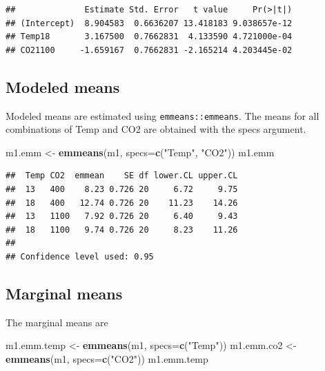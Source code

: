 \documentclass[]{book}
\newenvironment{Shaded}{\begin{snugshade}}{\end{snugshade}}
\newcommand{\DataTypeTok}[1]{\textcolor[rgb]{0.13,0.29,0.53}{#1}}
\newcommand{\KeywordTok}[1]{\textcolor[rgb]{0.13,0.29,0.53}{\textbf{#1}}}
\newcommand{\NormalTok}[1]{#1}
\newcommand{\StringTok}[1]{\textcolor[rgb]{0.31,0.60,0.02}{#1}}
\begin{document}
\begin{verbatim}
##              Estimate Std. Error   t value     Pr(>|t|)
## (Intercept)  8.904583  0.6636207 13.418183 9.038657e-12
## Temp18       3.167500  0.7662831  4.133590 4.721000e-04
## CO21100     -1.659167  0.7662831 -2.165214 4.203445e-02
\end{verbatim}

\hypertarget{modeled-means}{%
\subsection{Modeled means}\label{modeled-means}}

Modeled means are estimated using \texttt{emmeans::emmeans}. The means for all combinations of Temp and CO2 are obtained with the specs argument.

\begin{Shaded}
\begin{Highlighting}[]
\NormalTok{m1.emm <-}\StringTok{ }\KeywordTok{emmeans}\NormalTok{(m1, }\DataTypeTok{specs=}\KeywordTok{c}\NormalTok{(}\StringTok{"Temp"}\NormalTok{, }\StringTok{"CO2"}\NormalTok{))}
\NormalTok{m1.emm}
\end{Highlighting}
\end{Shaded}

\begin{verbatim}
##  Temp CO2  emmean    SE df lower.CL upper.CL
##  13   400    8.23 0.726 20     6.72     9.75
##  18   400   12.74 0.726 20    11.23    14.26
##  13   1100   7.92 0.726 20     6.40     9.43
##  18   1100   9.74 0.726 20     8.23    11.26
## 
## Confidence level used: 0.95
\end{verbatim}

\hypertarget{marginal-means}{%
\subsection{Marginal means}\label{marginal-means}}

The marginal means are

\begin{Shaded}
\begin{Highlighting}[]
\NormalTok{m1.emm.temp <-}\StringTok{ }\KeywordTok{emmeans}\NormalTok{(m1, }\DataTypeTok{specs=}\KeywordTok{c}\NormalTok{(}\StringTok{"Temp"}\NormalTok{))}
\NormalTok{m1.emm.co2 <-}\StringTok{ }\KeywordTok{emmeans}\NormalTok{(m1, }\DataTypeTok{specs=}\KeywordTok{c}\NormalTok{(}\StringTok{"CO2"}\NormalTok{))}
\NormalTok{m1.emm.temp}
\end{Highlighting}
\end{Shaded}
\end{document}
